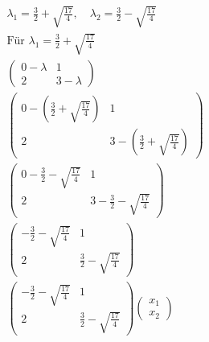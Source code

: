 \begin{align*}
    \lambda_1 = \frac{3}{2} + \sqrt{\frac{17}{4}}, \quad \lambda_2 = \frac{3}{2} - \sqrt{\frac{17}{4}}                                                                   \\
    \text{Für } \lambda_1 = \frac{3}{2} + \sqrt{\frac{17}{4}}                                                                                                            \\
    \begin{pmatrix}
        0 - \lambda & 1           \\
        2           & 3 - \lambda
    \end{pmatrix}                                                                                                                                            \\
    \begin{pmatrix}
        0 - \left(\frac{3}{2} + \sqrt{\frac{17}{4}}\right) & 1                                                  \\
        2                                                  & 3 - \left(\frac{3}{2} + \sqrt{\frac{17}{4}}\right)
    \end{pmatrix} \\
    \begin{pmatrix}
        0 - \frac{3}{2} - \sqrt{\frac{17}{4}} & 1                                    \\
        2                                     & 3 -\frac{3}{2} - \sqrt{\frac{17}{4}}
    \end{pmatrix}                                                                              \\
    \begin{pmatrix}
        -\frac{3}{2} - \sqrt{\frac{17}{4}} & 1                                 \\
        2                                  & \frac{3}{2} - \sqrt{\frac{17}{4}}
    \end{pmatrix}                                                                                    \\
    \begin{pmatrix}
        -\frac{3}{2} - \sqrt{\frac{17}{4}} & 1                                 \\
        2                                  & \frac{3}{2} - \sqrt{\frac{17}{4}}
    \end{pmatrix} \begin{pmatrix}
                      x_1 \\ x_2

\end{pmatrix}
\end{align*}
